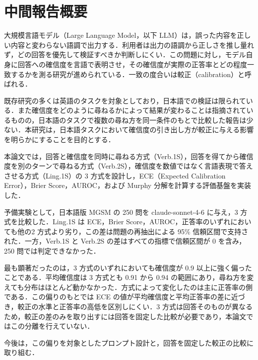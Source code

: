 \chapter*{中間報告概要}

大規模言語モデル（Large Language Model，以下 LLM）は，誤った内容を正しい内容と変わらない語調で出力する．利用者は出力の語調から正しさを推し量れず，どの回答を優先して検証すべきか判断しにくい．この問題に対し，モデル自身に回答への確信度を言語で表明させ，その確信度が実際の正答率とどの程度一致するかを測る研究が進められている．一致の度合いは較正（calibration）と呼ばれる．

既存研究の多くは英語のタスクを対象としており，日本語での検証は限られている．また確信度をどのように尋ねるかによって結果が変わることは指摘されているものの，日本語のタスクで複数の尋ね方を同一条件のもとで比較した報告は少ない．本研究は，日本語タスクにおいて確信度の引き出し方が較正に与える影響を明らかにすることを目的とする．

本論文では，回答と確信度を同時に尋ねる方式（Verb.1S），回答を得てから確信度を別のターンで尋ねる方式（Verb.2S），確信度を数値ではなく言語表現で答えさせる方式（Ling.1S）の 3 方式を設計し，ECE（Expected Calibration Error），Brier Score，AUROC，および Murphy 分解を計算する評価基盤を実装した．

予備実験として，日本語版 MGSM の 250 問を claude-sonnet-4-6 に与え，3 方式を比較した．Ling.1S は ECE，Brier Score，AUROC，正答率のいずれにおいても他の2 方式より劣り，この差は問題の再抽出による 95\% 信頼区間で支持された．一方，Verb.1S と Verb.2S の差はすべての指標で信頼区間が 0 を含み，250 問では判定できなかった．

最も顕著だったのは，3 方式のいずれにおいても確信度が 0.9 以上に強く偏ったことである．平均確信度は 3 方式とも 0.91 から 0.94 の範囲にあり，尋ね方を変えても分布はほとんど動かなかった．方式によって変化したのは主に正答率の側である．この偏りのもとでは ECE の値が平均確信度と平均正答率の差に近づき，較正の水準と正答率の高低を区別しにくい．3 方式は回答そのものが異なるため，較正の差のみを取り出すには回答を固定した比較が必要であり，本論文ではこの分離を行えていない．

今後は，この偏りを対象としたプロンプト設計と，回答を固定した較正の比較に取り組む．
